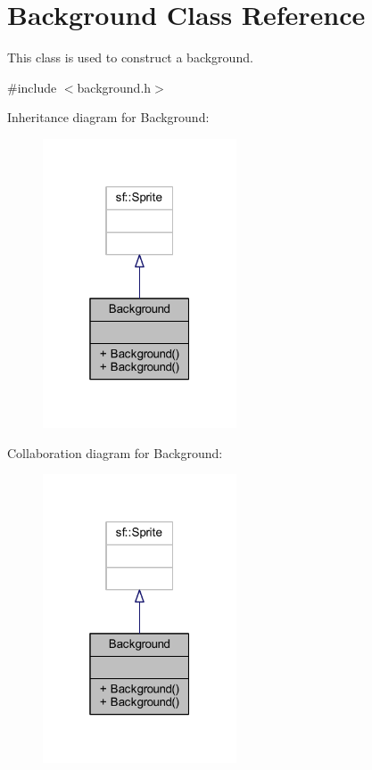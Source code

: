 \hypertarget{class_background}{}\section{Background Class Reference}
\label{class_background}


This class is used to construct a background.  




{\ttfamily \#include $<$background.\+h$>$}



Inheritance diagram for Background\+:\nopagebreak
\begin{figure}[H]
\begin{center}
\leavevmode
\includegraphics[width=163pt]{class_background__inherit__graph}
\end{center}
\end{figure}


Collaboration diagram for Background\+:\nopagebreak
\begin{figure}[H]
\begin{center}
\leavevmode
\includegraphics[width=163pt]{class_background__coll__graph}
\end{center}
\end{figure}
